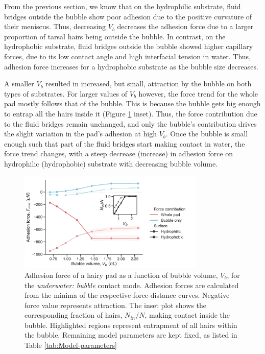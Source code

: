 \documentclass[vruler,JEB]{COB}%
\begin{document}
From the previous section, we know that on the hydrophilic substrate,
fluid bridges outside the bubble show poor adhesion due to the positive
curvature of their meniscus. Thus, decreasing $V_{b}$ decreases
the adhesion force due to a larger proportion of tarsal hairs being outside
the bubble. In contrast, on the hydrophobic substrate, fluid bridges
outside the bubble showed higher capillary forces, due to its low contact
angle and high interfacial tension in water. Thus, adhesion force
increases for a hydrophobic substrate as the bubble size decreases. 

A smaller $V_{b}$ resulted in increased, but small, attraction
by the bubble on both types of substrates. For larger values of $V_{b}$
however, the force trend for the whole pad mostly follows that of
the bubble. This is because the bubble gets big enough to entrap all
the hairs inside it (Figure \ref{fig:Effect-of-bubble} inset). Thus, the force contribution due to the fluid
bridges remain unchanged, and only the bubble's contribution drives
the slight variation in the pad's adhesion at high $V_{b}$.
Once the bubble is small enough such that part of the fluid bridges
start making contact in water, the force trend changes, with a steep
decrease (increase) in adhesion force on hydrophilic (hydrophobic)
substrate with decreasing bubble volume.

\begin{figure}
\includegraphics[width=3.5in]{Figure7-Model_effect_of_bubble_volume}\caption{\label{fig:Effect-of-bubble} Adhesion force of a hairy
pad as a function of bubble volume, $V_{b}$, for the
\emph{underwater: bubble} contact mode. Adhesion forces are calculated
from the minima of the respective force-distance curves. Negative
force value represents attraction. The inset plot shows the corresponding fraction of hairs, $N_{in}/N$, making contact inside the bubble. Highlighted regions represent entrapment of all hairs
within the bubble. Remaining model parameters are kept fixed, as listed in Table \ref{tab:Model-parameters}}
\end{figure}
\end{document}
